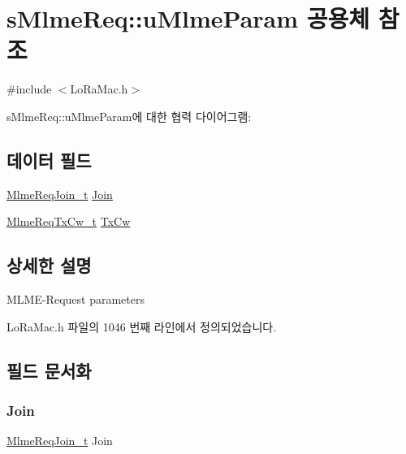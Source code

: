 \hypertarget{unions_mlme_req_1_1u_mlme_param}{}\section{s\+Mlme\+Req\+:\+:u\+Mlme\+Param 공용체 참조}
\label{unions_mlme_req_1_1u_mlme_param}


{\ttfamily \#include $<$Lo\+Ra\+Mac.\+h$>$}



s\+Mlme\+Req\+:\+:u\+Mlme\+Param에 대한 협력 다이어그램\+:
\subsection*{데이터 필드}
\begin{DoxyCompactItemize}
\item 
\mbox{\hyperlink{group___l_o_r_a_m_a_c_gab12f7f7d9bdfb8067d56f7c9f1297d95}{Mlme\+Req\+Join\+\_\+t}} \mbox{\hyperlink{unions_mlme_req_1_1u_mlme_param_a172a908e5643a97e1e911d97d8b2c363}{Join}}
\item 
\mbox{\hyperlink{group___l_o_r_a_m_a_c_gab71a9931686ff623fa01ceecc61f1986}{Mlme\+Req\+Tx\+Cw\+\_\+t}} \mbox{\hyperlink{unions_mlme_req_1_1u_mlme_param_aa69808af2b2999fc4b8b409b593173ab}{Tx\+Cw}}
\end{DoxyCompactItemize}


\subsection{상세한 설명}
M\+L\+M\+E-\/\+Request parameters 

Lo\+Ra\+Mac.\+h 파일의 1046 번째 라인에서 정의되었습니다.



\subsection{필드 문서화}
\mbox{\label{unions_mlme_req_1_1u_mlme_param_a172a908e5643a97e1e911d97d8b2c363}} 
\subsubsection{\texorpdfstring{Join}{Join}}
{\footnotesize\ttfamily \mbox{\hyperlink{group___l_o_r_a_m_a_c_gab12f7f7d9bdfb8067d56f7c9f1297d95}{Mlme\+Req\+Join\+\_\+t}} Join}

